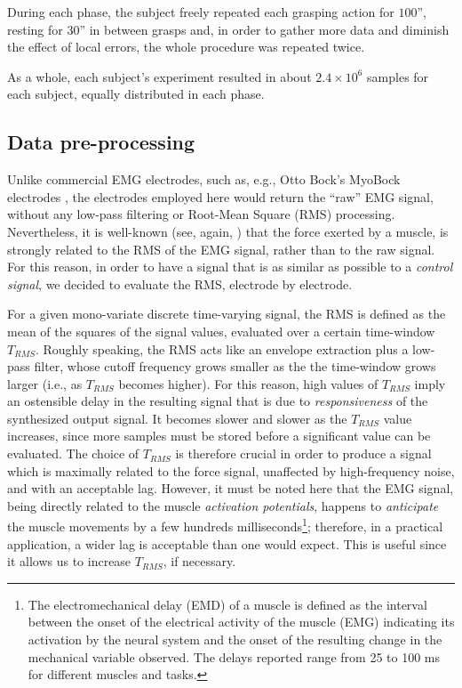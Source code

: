 During each phase, the subject freely repeated each grasping action for $100$'', resting for $30$'' in between grasps and, in order to gather more data and diminish the effect of local errors, the whole procedure was repeated twice.

As a whole, each subject's experiment resulted in about $2.4\times 10^6$ samples for each subject, equally distributed in each phase.

\subsection{Data pre-processing}

Unlike commercial EMG electrodes, such as, e.g., Otto Bock's MyoBock electrodes \cite{ottobock}, the electrodes employed here would return the ``raw'' EMG signal, without any low-pass filtering or Root-Mean Square (RMS) processing. Nevertheless, it is well-known (see, again, \cite{deluca,zecca}) that the force exerted by a muscle, is strongly related to the RMS of the EMG signal, rather than to the raw signal. For this reason, in order to have a signal that is as similar as possible to a \emph{control signal}, we decided to evaluate the RMS, electrode by electrode.

For a given mono-variate discrete time-varying signal, the RMS is defined as the mean of the squares of the signal values, evaluated over a certain time-window $T_{RMS}$. Roughly speaking, the RMS acts like an envelope extraction plus a low-pass filter, whose cutoff frequency grows smaller as the the time-window grows larger (i.e., as $T_{RMS}$ becomes higher). For this reason, high values of $T_{RMS}$ imply an ostensible delay in the resulting signal that is due to \emph{responsiveness} of the synthesized output signal. It becomes slower and slower as the $T_{RMS}$ value increases, since more samples must be stored before a significant value can be evaluated. The choice of $T_{RMS}$ is therefore crucial in order to produce a signal which is maximally related to the force signal, unaffected by high-frequency noise, and with an acceptable lag. However, it must be noted here that the EMG signal, being directly related to the muscle \emph{activation potentials}, happens to \emph{anticipate} the muscle movements by a few hundreds milliseconds\footnote{The electromechanical delay (EMD) of a muscle is defined as the interval between the onset of the electrical activity of the muscle (EMG) indicating its activation by the neural system and the onset of the resulting change in the mechanical variable observed. The delays reported range from 25 to 100 ms for different muscles and tasks\cite{Wolf1994}.}; therefore, in a practical application, a wider lag is acceptable than one would expect. This is useful since it allows us to increase $T_{RMS}$, if necessary.

